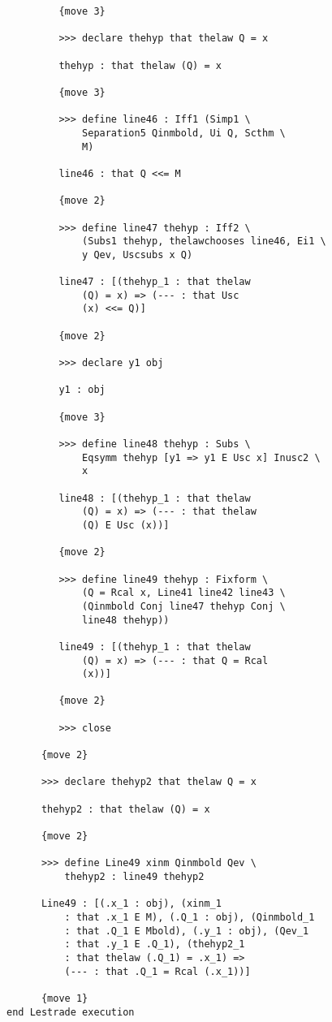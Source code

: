 \documentclass[12pt]{article}
\begin{document}
\begin{verbatim}
         {move 3}

         >>> declare thehyp that thelaw Q = x

         thehyp : that thelaw (Q) = x

         {move 3}

         >>> define line46 : Iff1 (Simp1 \
             Separation5 Qinmbold, Ui Q, Scthm \
             M)

         line46 : that Q <<= M

         {move 2}

         >>> define line47 thehyp : Iff2 \
             (Subs1 thehyp, thelawchooses line46, Ei1 \
             y Qev, Uscsubs x Q)

         line47 : [(thehyp_1 : that thelaw 
             (Q) = x) => (--- : that Usc 
             (x) <<= Q)]

         {move 2}

         >>> declare y1 obj

         y1 : obj

         {move 3}

         >>> define line48 thehyp : Subs \
             Eqsymm thehyp [y1 => y1 E Usc x] Inusc2 \
             x

         line48 : [(thehyp_1 : that thelaw 
             (Q) = x) => (--- : that thelaw 
             (Q) E Usc (x))]

         {move 2}

         >>> define line49 thehyp : Fixform \
             (Q = Rcal x, Line41 line42 line43 \
             (Qinmbold Conj line47 thehyp Conj \
             line48 thehyp))

         line49 : [(thehyp_1 : that thelaw 
             (Q) = x) => (--- : that Q = Rcal 
             (x))]

         {move 2}

         >>> close

      {move 2}

      >>> declare thehyp2 that thelaw Q = x

      thehyp2 : that thelaw (Q) = x

      {move 2}

      >>> define Line49 xinm Qinmbold Qev \
          thehyp2 : line49 thehyp2

      Line49 : [(.x_1 : obj), (xinm_1 
          : that .x_1 E M), (.Q_1 : obj), (Qinmbold_1 
          : that .Q_1 E Mbold), (.y_1 : obj), (Qev_1 
          : that .y_1 E .Q_1), (thehyp2_1 
          : that thelaw (.Q_1) = .x_1) => 
          (--- : that .Q_1 = Rcal (.x_1))]

      {move 1}
end Lestrade execution
\end{verbatim}
\end{document}

